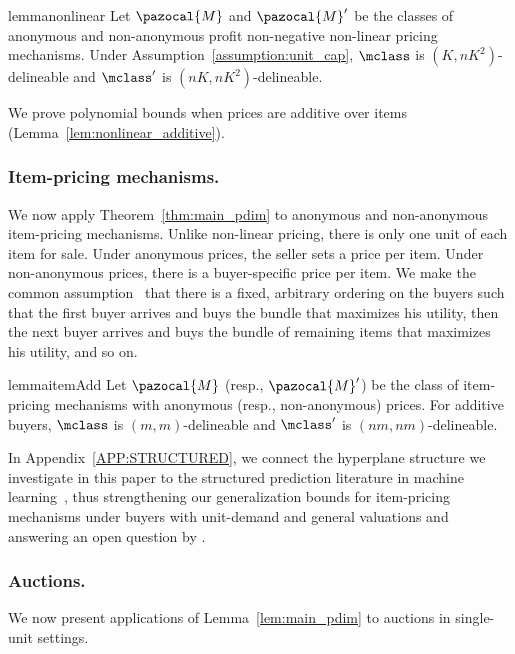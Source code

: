 \begin{restatable}{lemma}{nonlinear}\label{lem:nonlinear}
Let $\pazocal{M}$ and $\pazocal{M}'$ be the classes of anonymous and non-anonymous profit non-negative non-linear pricing mechanisms. Under Assumption~\ref{assumption:unit_cap},
$\mclass$ is $\left(K, nK^2\right)$-delineable and $\mclass'$ is $\left(nK, nK^2\right)$-delineable.
\end{restatable}

We prove polynomial bounds when prices are additive over items (Lemma~\ref{lem:nonlinear_additive}).

\subsubsection{Item-pricing mechanisms.}
We now apply Theorem~\ref{thm:main_pdim} to anonymous and non-anonymous item-pricing mechanisms. Unlike non-linear pricing, there is only one unit of each item for sale. 
Under anonymous prices, the seller sets a price per item. Under non-anonymous prices, there is a buyer-specific price per item. We make the common assumption~\citep[e.g.,][]{Feldman15:Combinatorial, Babaioff14:Simple, Cai16:Duality} that there is a fixed, arbitrary ordering on the buyers such that the first buyer arrives and buys the bundle that maximizes his utility, then the next buyer arrives and buys the bundle of remaining items that maximizes his utility, and so on.

\begin{restatable}{lemma}{itemAdd}\label{lem:item_pricing_add}
Let $\pazocal{M}$ (resp., $\pazocal{M}'$) be the class of item-pricing mechanisms with anonymous (resp., non-anonymous) prices. For additive buyers, $\mclass$ is $\left(m, m\right)$-delineable and $\mclass'$ is $\left(nm,nm\right)$-delineable.
\end{restatable}

In Appendix~\ref{APP:STRUCTURED}, we connect the hyperplane structure we investigate in this paper to the structured prediction literature in machine learning~\citep{Collins00:Discriminative}, thus strengthening our generalization bounds for item-pricing mechanisms under buyers with unit-demand and general valuations and answering an open question by \citet{Morgenstern16:Learning}.


\subsubsection{Auctions.} We now present applications of Lemma~\ref{lem:main_pdim} to auctions in single-unit settings.


